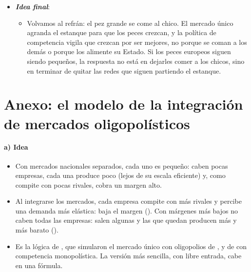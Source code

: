 \documentclass[11pt]{article}
\begin{document}
\begin{itemize}
\begin{itemize}
  \item Quien pide campeones suele ser el que aspira a serlo, y ya lo advirtió  (1971): «por regla general, la industria adquiere la regulación, que se diseña y se aplica sobre todo en su beneficio»\footnote{En el original, \textcite{Stigler1971Theory}, p.~3: «as a rule, regulation is acquired by the industry and is designed and operated primarily for its benefit».}.
  \end{itemize}
\item \textbf{\emph{Idea final}}:
  \begin{itemize}
  \item Volvamos al refrán: el pez grande se come al chico. El mercado único agranda el estanque para que los peces crezcan, y la política de competencia vigila que crezcan por ser mejores, no porque se coman a los demás o porque los alimente su Estado. Si los peces europeos siguen siendo pequeños, la respuesta no está en dejarles comer a los chicos, sino en terminar de quitar las redes que siguen partiendo el estanque.
  \end{itemize}
\end{itemize}

\clearpage
\appendix

\section{Anexo: el modelo de la integración\cortetitulo{} de mercados oligopolísticos}\label{anexo:integracion}

\paragraph{a) Idea}

\begin{itemize}
\item Con mercados nacionales separados, cada uno es pequeño: caben pocas empresas, cada una produce poco (lejos de su escala eficiente) y, como compite con pocas rivales, cobra un margen alto.
\item Al integrarse los mercados, cada empresa compite con más rivales y percibe una demanda más elástica: baja el margen (). Con márgenes más bajos no caben todas las empresas: salen algunas y las que quedan producen más y más barato ().
\item Es la lógica de \textcite{SmithVenables1988Completing}, que simularon el mercado único con oligopolios de , y de \textcite{Krugman1979Increasing} con competencia monopolística. La versión más sencilla, con libre entrada, cabe en una fórmula.
\end{itemize}
\end{document}
